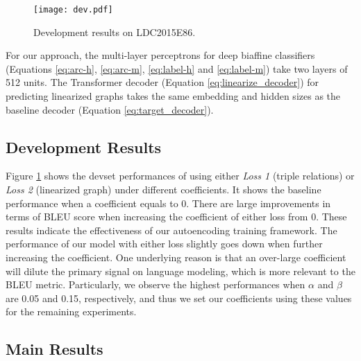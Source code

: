 \documentclass[11pt,a4paper]{article}
\begin{document}
\begin{figure}
    \centering
    \texttt{[image: dev.pdf]}
    \caption{Development results on LDC2015E86.}
    \label{fig:dev_results}
\end{figure}


For our approach, the multi-layer perceptrons for deep biaffine classifiers (Equations \ref{eq:arc-h}, \ref{eq:arc-m}, \ref{eq:label-h} and \ref{eq:label-m}) take two layers of 512 units.
The Transformer decoder (Equation \ref{eq:linearize_decoder}) for predicting linearized graphs takes the same embedding and hidden sizes as the baseline decoder (Equation \ref{eq:target_decoder}).


\subsection{Development Results}


Figure \ref{fig:dev_results} shows the devset performances of using either \emph{Loss 1} (triple relations) or \emph{Loss 2} (linearized graph) under different coefficients.
It shows the baseline performance when a coefficient equals to 0.
There are large improvements in terms of BLEU score when increasing the coefficient of either loss from 0.
These results indicate the effectiveness of our autoencoding training framework.
The performance of our model with either loss slightly goes down when further increasing the coefficient.
One underlying reason is that an over-large coefficient will dilute the primary signal on language modeling, which is more relevant to the BLEU metric.
Particularly, we observe the highest performances when $\alpha$ and $\beta$ are 0.05 and 0.15, respectively, and thus we set our coefficients using these values for the remaining experiments.


\subsection{Main Results}
\end{document}
